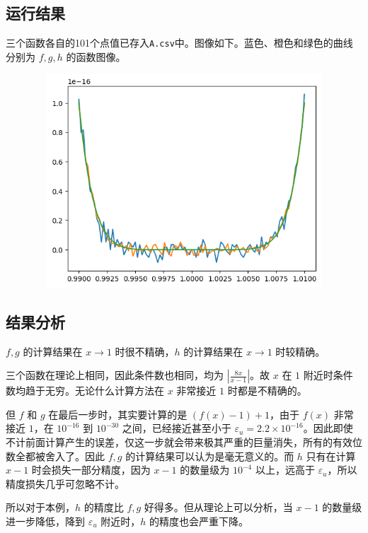 \documentclass{ctexart}
\begin{document}
\subsection{运行结果}
三个函数各自的101个点值已存入\verb|A.csv|中。图像如下。蓝色、橙色和绿色的曲线分别为 $f,g,h$ 的函数图像。

\begin{figure}[h]
    \begin{minipage}{4cm}
	\includegraphics[width = 12cm, height = 8cm]{A.png}
	\label{fig1}
	\end{minipage}
\end{figure}

\subsection{结果分析}

$f,g$ 的计算结果在 $x\rightarrow 1$ 时很不精确，$h$ 的计算结果在 $x\rightarrow 1$ 时较精确。

三个函数在理论上相同，因此条件数也相同，均为 $|\frac {8x}{x-1}|$。故 $x$ 在 $1$ 附近时条件数均趋于无穷。无论什么计算方法在 $x$ 非常接近 $1$ 时都是不精确的。

但 $f$ 和 $g$ 在最后一步时，其实要计算的是 $(f(x)-1)+1$，由于 $f(x)$ 非常接近 $1$，在 $10^{-16}$ 到 $10^{-30}$ 之间，已经接近甚至小于 $\varepsilon_u=2.2\times 10^{-16}$。因此即使不计前面计算产生的误差，仅这一步就会带来极其严重的巨量消失，所有的有效位数全都被舍入了。因此 $f,g$ 的计算结果可以认为是毫无意义的。而 $h$ 只有在计算 $x-1$ 时会损失一部分精度，因为 $x-1$ 的数量级为 $10^{-4}$ 以上，远高于 $\varepsilon_u$，所以精度损失几乎可忽略不计。

所以对于本例，$h$ 的精度比 $f,g$ 好得多。但从理论上可以分析，当 $x-1$ 的数量级进一步降低，降到 $\varepsilon_u$ 附近时，$h$ 的精度也会严重下降。
\end{document}
